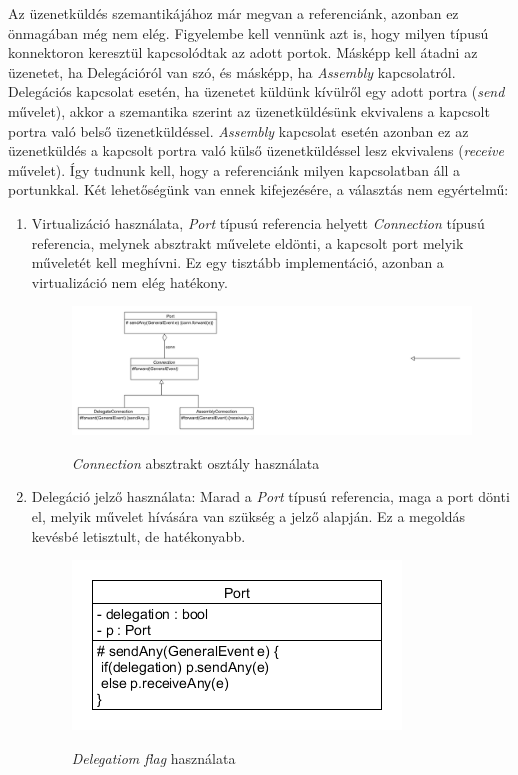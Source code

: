 \documentclass[a4paper,12pt]{report}
\begin{document}
Az üzenetküldés szemantikájához már megvan a referenciánk, azonban ez önmagában még nem elég. Figyelembe kell vennünk azt is, hogy milyen típusú konnektoron keresztül kapcsolódtak az adott portok. Másképp kell átadni az üzenetet, ha Delegációról van szó, és másképp, ha \textit{Assembly} kapcsolatról. Delegációs kapcsolat esetén, ha üzenetet küldünk kívülről egy adott portra (\textit{send} művelet), akkor a szemantika szerint az üzenetküldésünk ekvivalens a kapcsolt portra való belső üzenetküldéssel. \textit{Assembly} kapcsolat esetén azonban ez az üzenetküldés a kapcsolt portra való külső üzenetküldéssel lesz ekvivalens (\textit{receive} művelet).
Így tudnunk kell, hogy a referenciánk milyen kapcsolatban áll a portunkkal. Két lehetőségünk van ennek kifejezésére, a választás nem egyértelmű:
\begin{enumerate}
\item Virtualizáció használata, \textit{Port} típusú referencia helyett \textit{Connection} típusú referencia, melynek absztrakt művelete eldönti, a kapcsolt port melyik műveletét kell meghívni. Ez egy tisztább implementáció, azonban a virtualizáció nem elég hatékony.

\begin{figure}[H]
\begin{center}
\includegraphics[scale=0.65]{connection.png} \\
\end{center}
\caption{\textit{Connection} absztrakt osztály használata}
\end{figure}

\item Delegáció jelző használata: Marad a \textit{Port} típusú referencia, maga a port dönti el, melyik művelet hívására van szükség a jelző alapján. Ez a megoldás kevésbé letisztult, de hatékonyabb. \\
\begin{figure}[H]
\begin{center}
\includegraphics[scale=0.9]{connection_with_flag.png} \\
\end{center}
\caption{\textit{Delegatiom flag} használata}
\end{figure}

\end{enumerate}
\end{document}
